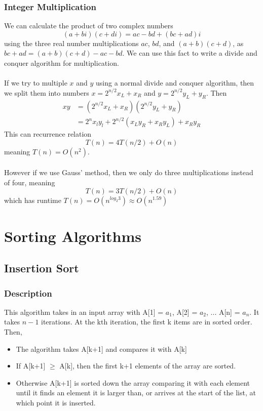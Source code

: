 \documentclass{article}
\begin{document}
        \subsubsection{Integer Multiplication}
            We can calculate the product of two complex numbers
            \[ (a + bi)(c + di) = ac - bd + (bc + ad)i \]
            using the three real number multiplications $ac$, $bd$, and $(a+b)(c+d)$, as $bc + ad = (a+b)(c+d) - ac - bd$. We can use this fact to write a divide and conquer algorithm for multiplication. \\ \\
            If we try to multiple $x$ and $y$ using a normal divide and conquer algorithm, then we split them into numbers $x = 2^{n/2} x_L + x_R$ and $y = 2^{n/2} y_L + y_R$. Then 
            \begin{align*}
                xy &= (2^{n/2}x_L + x_R)(2^{n/2}y_L + y_R) \\
                   &= 2^nx_ly_l + 2^{n/2}(x_Ly_R + x_Ry_L) + x_Ry_R
            \end{align*}
            This can recurrence relation
            \[ T(n) = 4T(n/2) + O(n) \]
            meaning $T(n) = O(n^2)$. \\ \\
            However if we use Gauss' method, then we only do three multiplications instead of four, meaning
            \[ T(n) = 3T(n/2) + O(n) \]
            which has runtime $T(n) = O(n^{log_2 3}) \approx O(n^{1.59})$

\section{Sorting Algorithms}
    \subsection{Insertion Sort}
        \subsubsection{Description}
            This algorithm takes in an input array with A[1] = $a_1$, A[2] = $a_2$, ... A[n] = $a_n$. It takes $n-1$ iterations. At the kth iteration, the first k items are in sorted order. Then,
            \begin{itemize}
                \item The algorithm takes A[k+1] and compares it with A[k]
                \item If A[k+1] $\geq $ A[k], then the first k+1 elements of the array are sorted.
                \item Otherwise A[k+1] is sorted down the array comparing it with each element until it finds an element it is larger than, or arrives at the start of the list, at which point it is inserted.
            \end{itemize}
\end{document}
